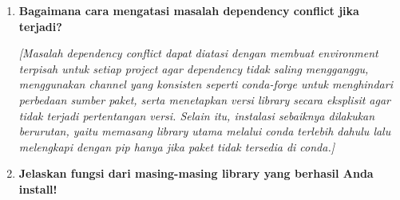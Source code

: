 \documentclass[11pt,a4paper]{article}
\begin{document}
\begin{enumerate}
    \item \textbf{Bagaimana cara mengatasi masalah dependency conflict jika terjadi?}
    
    \textit{[Masalah dependency conflict dapat diatasi dengan membuat environment terpisah untuk setiap project agar dependency tidak saling mengganggu, menggunakan channel yang konsisten seperti conda-forge untuk menghindari perbedaan sumber paket, serta menetapkan versi library secara eksplisit agar tidak terjadi pertentangan versi. Selain itu, instalasi sebaiknya dilakukan berurutan, yaitu memasang library utama melalui conda terlebih dahulu lalu melengkapi dengan pip hanya jika paket tidak tersedia di conda.]}
    
    \item \textbf{Jelaskan fungsi dari masing-masing library yang berhasil Anda install!}
    

\end{enumerate}
\end{document}
